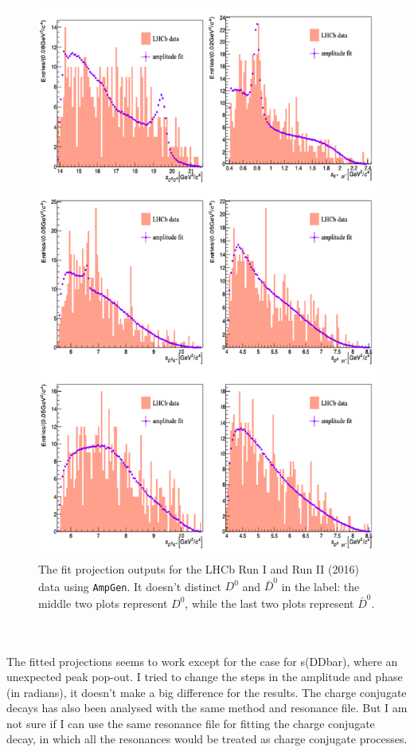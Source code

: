 \begin{figure}[h]
\center
\includegraphics*[width=0.76\linewidth]{amplitude_fit/amp_fit_proj}
\caption{The fit projection outputs for the LHCb Run I and Run II (2016) data using \texttt{AmpGen}. It doesn't distinct $D^0$ and $\bar{D}^0$ in the label: the middle two plots represent $D^0$, while the last two plots represent $\bar{D}^0$.}
\label{amp_fit_proj}
\end{figure}
\\
\\
The fitted projections seems to work except for the case for s(DDbar), where an unexpected peak pop-out. I tried to change the steps in the amplitude and phase (in radians), it doesn't make a big difference for the results. 
\clearpage
\noindent The charge conjugate decays has also been analysed with the same method and resonance file. But I am not sure if I can use the same resonance file for fitting the charge conjugate decay, in which all the resonances would be treated as charge conjugate processes.
\\
\\
